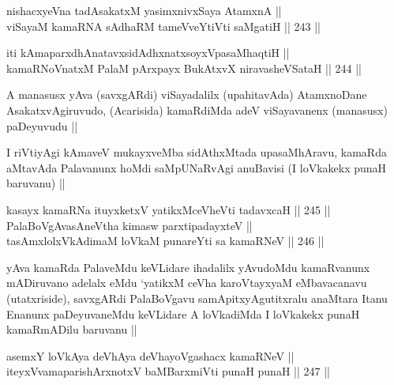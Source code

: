 \begin{shl}
nishacxyeVna tadAsakatxM yasimxnivxSaya AtamxnA || \\
viSayaM kamaRNA sAdhaRM tameVveYtiVti saMgatiH ||  243 ||  
\end{shl}
				
\begin{shl}
iti kAmaparxdhAnatavxsidAdhxnatxsoyxVpasaMhaqtiH || \\
kamaRNoV\s natxM PalaM pArxpayx BukAtxvX niravasheVSataH ||  244 ||  
\end{shl}

\begin{artha}
A manasusx yAva (savxgARdi) viSayadalilx (upahitavAda) AtamxnoDane
AsakatxvAgiruvudo, (Acarisida) kamaRdiMda adeV viSayavanenx (manasusx)
paDeyuvudu ||
\end{artha}


\begin{artha}
I riVtiyAgi kAmaveV mukayxveMba sidAthxMtada upasaMhAravu, kamaRda
aMtavAda Palavanunx hoMdi saMpUNaRvAgi anuBavisi (I loVkakekx punaH
baruvanu) ||
\end{artha}


\begin{shl}
kasayx kamaRNa ituyxketxV yatikxMceVheVti tadavxcaH ||  245 ||  \\
PalaBoVgAvasAneV\s tha kimasw parxtipadayxteV || \\
tasAmxlolxVkAdimaM loVkaM punareYti sa kamaRNeV ||  246 ||  
\end{shl}

\begin{artha}
yAva kamaRda PalaveMdu keVLidare ihadalilx yAvudoMdu kamaRvanunx
mADiruvano adelalx eMdu `yatikxM ceVha karoVtayxyaM eMbavacanavu
(utatxriside), savxgARdi PalaBoVgavu samApitxyAgutitxralu anaMtara
Itanu Enanunx paDeyuvaneMdu keVLidare A loVkadiMda I loVkakekx punaH
kamaRmADilu baruvanu ||
\end{artha}


\begin{shl}
asemxY loVkAya deVhAya deVhayoVgashacx kamaRNeV || \\
iteyxVvamaparishArxnotxV baMBarxmiVti punaH punaH ||  247 ||  
\end{shl}

